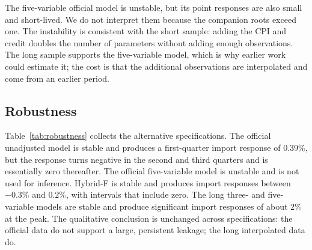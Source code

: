 \documentclass[11pt,a4paper]{article}
\begin{document}
The five-variable official model is unstable, but its point responses are also small and short-lived. We do not interpret them because the companion roots exceed one. The instability is consistent with the short sample: adding the CPI and credit doubles the number of parameters without adding enough observations. The long sample supports the five-variable model, which is why earlier work could estimate it; the cost is that the additional observations are interpolated and come from an earlier period.

\subsection{Robustness}
\label{sec:robustness}

Table~\ref{tab:robustness} collects the alternative specifications. The official unadjusted model is stable and produces a first-quarter import response of 0.39\%, but the response turns negative in the second and third quarters and is essentially zero thereafter. The official five-variable model is unstable and is not used for inference. Hybrid-F is stable and produces import responses between $-0.3\%$ and $0.2\%$, with intervals that include zero. The long three- and five-variable models are stable and produce significant import responses of about 2\% at the peak. The qualitative conclusion is unchanged across specifications: the official data do not support a large, persistent leakage; the long interpolated data do.
\end{document}
